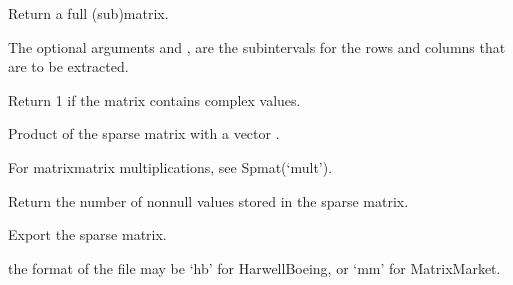 \documentclass[a4paper,11pt,english]{sphinxmanual}
\begin{document}
\begin{fulllineitems}
\begin{fulllineitems}
Return a full (sub\sphinxhyphen{})matrix.

The optional arguments  and , are the sub\sphinxhyphen{}intervals for the
rows and columns that are to be extracted.

\end{fulllineitems}


\begin{fulllineitems}
\label{\detokenize{python/cmdref_Spmat:getfem.Spmat.is_complex}}
Return 1 if the matrix contains complex values.

\end{fulllineitems}


\begin{fulllineitems}
\label{\detokenize{python/cmdref_Spmat:getfem.Spmat.mult}}
Product of the sparse matrix  with a vector .

For matrix\sphinxhyphen{}matrix multiplications, see Spmat(‘mult’).

\end{fulllineitems}


\begin{fulllineitems}
\label{\detokenize{python/cmdref_Spmat:getfem.Spmat.nnz}}
Return the number of non\sphinxhyphen{}null values stored in the sparse matrix.

\end{fulllineitems}


\begin{fulllineitems}
\label{\detokenize{python/cmdref_Spmat:getfem.Spmat.save}}
Export the sparse matrix.

the format of the file may be ‘hb’ for Harwell\sphinxhyphen{}Boeing, or ‘mm’
for Matrix\sphinxhyphen{}Market.


\end{fulllineitems}
\end{fulllineitems}
\end{document}
